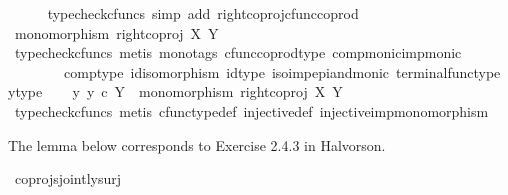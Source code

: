 \begin{isabellebody}
\ \ \ \ \isamarkupfalse%
\ {\isacharparenleft}{\kern0pt}typecheck{\isacharunderscore}{\kern0pt}cfuncs{\isacharcomma}{\kern0pt}\ simp\ add{\isacharcolon}{\kern0pt}\ right{\isacharunderscore}{\kern0pt}coproj{\isacharunderscore}{\kern0pt}cfunc{\isacharunderscore}{\kern0pt}coprod{\isacharparenright}{\kern0pt}\isanewline
\ \ \isamarkupfalse%
\ \isamarkupfalse%
\ {\isachardoublequoteopen}monomorphism\ {\isacharparenleft}{\kern0pt}right{\isacharunderscore}{\kern0pt}coproj\ X\ Y{\isacharparenright}{\kern0pt}{\isachardoublequoteclose}\isanewline
\ \ \ \ \isamarkupfalse%
\ {\isacharparenleft}{\kern0pt}typecheck{\isacharunderscore}{\kern0pt}cfuncs{\isacharcomma}{\kern0pt}\ metis\ {\isacharparenleft}{\kern0pt}mono{\isacharunderscore}{\kern0pt}tags{\isacharparenright}{\kern0pt}\ cfunc{\isacharunderscore}{\kern0pt}coprod{\isacharunderscore}{\kern0pt}type\ comp{\isacharunderscore}{\kern0pt}monic{\isacharunderscore}{\kern0pt}imp{\isacharunderscore}{\kern0pt}monic{\isacharprime}{\kern0pt}\isanewline
\ \ \ \ \ \ \ \ comp{\isacharunderscore}{\kern0pt}type\ id{\isacharunderscore}{\kern0pt}isomorphism\ id{\isacharunderscore}{\kern0pt}type\ iso{\isacharunderscore}{\kern0pt}imp{\isacharunderscore}{\kern0pt}epi{\isacharunderscore}{\kern0pt}and{\isacharunderscore}{\kern0pt}monic\ terminal{\isacharunderscore}{\kern0pt}func{\isacharunderscore}{\kern0pt}type\ y{\isacharunderscore}{\kern0pt}type{\isacharparenright}{\kern0pt}\isanewline
{}\isamarkupfalse%
\isanewline
\ \ \isamarkupfalse%
\ {\isachardoublequoteopen}{\isasymnexists}y{\isachardot}{\kern0pt}\ y\ {\isasymin}\isactrlsub c\ Y\ {\isasymLongrightarrow}\ monomorphism\ {\isacharparenleft}{\kern0pt}right{\isacharunderscore}{\kern0pt}coproj\ X\ Y{\isacharparenright}{\kern0pt}{\isachardoublequoteclose}\isanewline
\ \ \ \ \isamarkupfalse%
\ {\isacharparenleft}{\kern0pt}typecheck{\isacharunderscore}{\kern0pt}cfuncs{\isacharcomma}{\kern0pt}\ metis\ cfunc{\isacharunderscore}{\kern0pt}type{\isacharunderscore}{\kern0pt}def\ injective{\isacharunderscore}{\kern0pt}def\ injective{\isacharunderscore}{\kern0pt}imp{\isacharunderscore}{\kern0pt}monomorphism{\isacharparenright}{\kern0pt}\isanewline
{}\isamarkupfalse%
%
\endisatagproof
{\isafoldproof}%
%
\isadelimproof
%
\endisadelimproof
%
\begin{isamarkuptext}%
The lemma below corresponds to Exercise 2.4.3 in Halvorson.%
\end{isamarkuptext}\isamarkuptrue%
\isamarkupfalse%
\ coprojs{\isacharunderscore}{\kern0pt}jointly{\isacharunderscore}{\kern0pt}surj{\isacharcolon}{\kern0pt}\isanewline

\end{isabellebody}
